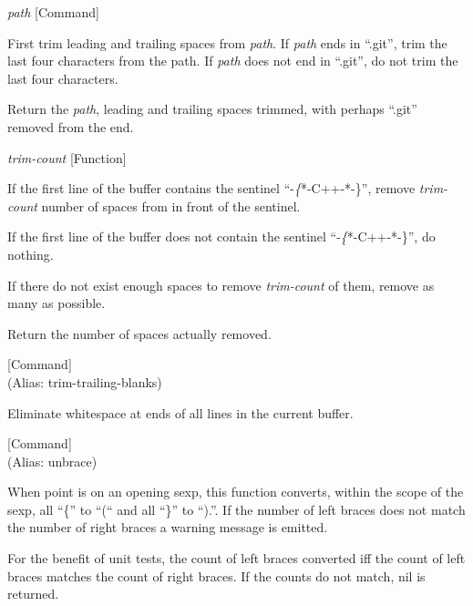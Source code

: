 \vspace{1em}
\noindent
{}
\usebox{\funcname}\emph{path}
 \hfill [Command]

\begin{doc-string}
First trim leading and trailing spaces from \emph{path}.  If \emph{path} ends in ``.git'',
trim the last four characters from the path.  If \emph{path} does not end in ``.git'',
do not trim the last four characters.

Return the \emph{path}, leading and trailing spaces trimmed, with perhaps ``.git''
removed from the end.
\end{doc-string}

\vspace{1em}
\noindent
{}
\usebox{\funcname}\emph{trim-count}
 \hfill [Function]

\begin{doc-string}
If the first line of the buffer contains the sentinel ``-\emph\{*-C++-*-\}'', remove
\emph{trim-count} number of spaces from in front of the sentinel.

If the first line of the buffer does not contain the sentinel ``-\emph\{*-C++-*-\}'',
do nothing.

If there do not exist enough spaces to remove \emph{trim-count} of them, remove
as many as possible.

Return the number of spaces actually removed.
\end{doc-string}

\vspace{1em}
\noindent
{}
\usebox{\funcname}
 \hfill [Command]\\%
 (Alias: trim-trailing-blanks)

\begin{doc-string}
Eliminate whitespace at ends of all lines in the current buffer.
\end{doc-string}

\vspace{1em}
\noindent
{}
\usebox{\funcname}
 \hfill [Command]\\%
 (Alias: unbrace)

\begin{doc-string}
When point is on an opening sexp, this function converts, within the scope of
the sexp, all ``\{'' to ``(`` and all ``\}'' to ``).''.
If the number of left braces does not match the number of right braces a warning
message is emitted.

For the benefit of unit tests, the count of left braces converted iff the count
of left braces matches the count of right braces.  If the counts do not match,
nil is returned.
\end{doc-string}

